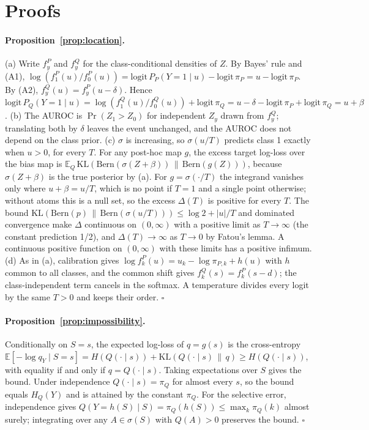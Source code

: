 \section{Proofs}
\label{sec:appendix-proofs}

\paragraph{Proposition~\ref{prop:location}.}
(a) Write $f^P_y$ and $f^Q_y$ for the class-conditional densities of $Z$. By Bayes' rule and (A1),
$\log(f^P_1(u)/f^P_0(u)) = \mathrm{logit}\, P_P(Y = 1 \mid u) - \mathrm{logit}\, \pi_P = u - \mathrm{logit}\, \pi_P$. By
(A2), $f^Q_y(u) = f^P_y(u - \delta)$. Hence $\mathrm{logit}\, P_Q(Y = 1 \mid u) = \log(f^Q_1(u)/f^Q_0(u)) +
\mathrm{logit}\, \pi_Q = u - \delta - \mathrm{logit}\, \pi_P + \mathrm{logit}\, \pi_Q = u + \beta$.
(b) The AUROC is $\Pr(Z_1 > Z_0)$ for independent $Z_y$ drawn from $f^Q_y$; translating both by $\delta$ leaves the
event unchanged, and the AUROC does not depend on the class prior.
(c) $\sigma$ is increasing, so $\sigma(u/T)$ predicts class 1 exactly when $u > 0$, for every $T$. For any post-hoc map
$g$, the excess target log-loss over the bias map is $\mathbb{E}_Q\,\mathrm{KL}(\mathrm{Bern}(\sigma(Z + \beta)) \,\|\,
\mathrm{Bern}(g(Z)))$, because $\sigma(Z + \beta)$ is the true posterior by (a). For $g = \sigma(\cdot/T)$ the integrand
vanishes only where $u + \beta = u/T$, which is no point if $T = 1$ and a single point otherwise; without atoms this is a
null set, so the excess $\Delta(T)$ is positive for every $T$. The bound
$\mathrm{KL}(\mathrm{Bern}(p) \,\|\, \mathrm{Bern}(\sigma(u/T))) \le \log 2 + |u|/T$ and dominated convergence make
$\Delta$ continuous on $(0, \infty)$ with a positive limit as $T \to \infty$ (the constant prediction 1/2), and
$\Delta(T) \to \infty$ as $T \to 0$ by Fatou's lemma. A continuous positive function on $(0, \infty)$ with these limits
has a positive infimum.
(d) As in (a), calibration gives $\log f^P_k(u) = u_k - \log \pi_{P,k} + h(u)$ with $h$ common to all classes, and the
common shift gives $f^Q_k(s) = f^P_k(s - d)$; the class-independent term cancels in the softmax. A temperature divides
every logit by the same $T > 0$ and keeps their order. $\square$

\paragraph{Proposition~\ref{prop:impossibility}.}
Conditionally on $S = s$, the expected log-loss of $q = g(s)$ is the cross-entropy
$\mathbb{E}[-\log q_Y \mid S = s] = H(Q(\cdot \mid s)) + \mathrm{KL}(Q(\cdot \mid s) \,\|\, q) \ge H(Q(\cdot \mid s))$,
with equality if and only if $q = Q(\cdot \mid s)$. Taking expectations over $S$ gives the bound. Under independence
$Q(\cdot \mid s) = \pi_Q$ for almost every $s$, so the bound equals $H_Q(Y)$ and is attained by the constant $\pi_Q$.
For the selective error, independence gives $Q(Y = h(S) \mid S) = \pi_Q(h(S)) \le \max_k \pi_Q(k)$ almost surely;
integrating over any $A \in \sigma(S)$ with $Q(A) > 0$ preserves the bound. $\square$

